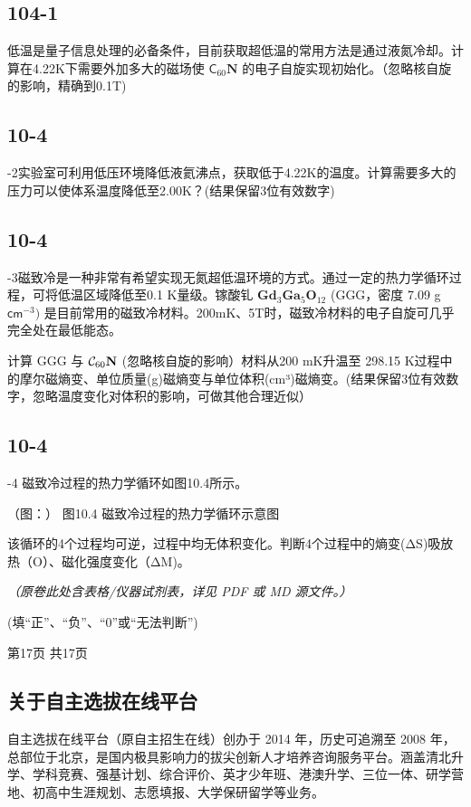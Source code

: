 \subsection*{104-1}
低温是量子信息处理的必备条件，目前获取超低温的常用方法是通过液氮冷却。计算在4.22K下需要外加多大的磁场使 ${ \mathsf { C } } _ { 6 0 } \mathbf { N }$ 的电子自旋实现初始化。（忽略核自旋的影响，精确到0.1T)

\subsection*{10-4}
-2实验室可利用低压环境降低液氦沸点，获取低于4.22K的温度。计算需要多大的压力可以使体系温度降低至2.00K？(结果保留3位有效数字)

\subsection*{10-4}
-3磁致冷是一种非常有希望实现无氮超低温环境的方式。通过一定的热力学循环过程，可将低温区域降低至0.1 K量级。镓酸钆 $\mathbf { G } \mathbf { d } _ { 3 } \mathbf { G } \mathbf { a } _ { 5 } \mathbf { O } _ { 1 2 }$ (GGG，密度 7.09 g$\mathsf { c m } ^ { - 3 } )$ 是目前常用的磁致冷材料。200mK、5T时，磁致冷材料的电子自旋可几乎完全处在最低能态。

计算 GGG 与 ${ \cal C } _ { 6 0 } \mathbf { N }$ (忽略核自旋的影响）材料从200 mK升温至 298.15 K过程中的摩尔磁熵变、单位质量(g)磁熵变与单位体积(cm³)磁熵变。(结果保留3位有效数字，忽略温度变化对体积的影响，可做其他合理近似）

\subsection*{10-4}
-4 磁致冷过程的热力学循环如图10.4所示。

（图：）
图10.4 磁致冷过程的热力学循环示意图

该循环的4个过程均可逆，过程中均无体积变化。判断4个过程中的熵变(ΔS)吸放热（O）、磁化强度变化（ΔM)。

\textit{（原卷此处含表格/仪器试剂表，详见 PDF 或 MD 源文件。）}

(填“正”、“负”、“0”或“无法判断”)

第17页 共17页

\subsection*{关于自主选拔在线平台}

自主选拔在线平台（原自主招生在线）创办于 2014 年，历史可追溯至 2008 年，总部位于北京，是国内极具影响力的拔尖创新人才培养咨询服务平台。涵盖清北升学、学科竞赛、强基计划、综合评价、英才少年班、港澳升学、三位一体、研学营地、初高中生涯规划、志愿填报、大学保研留学等业务。

